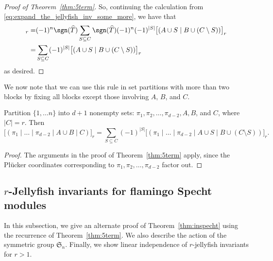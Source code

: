 \begin{proof}[Proof of Theorem~\ref{thm:5term}]
So, continuing the calculation from \eqref{eq:expand_the_jellyfish_inv_some_more}, we have that 
\begin{align*}
   [(A\cup B \ | \ C)]_r =& (-1)^n\sgn(\widehat{T})\sum_{S\subseteq C}\sgn(\widehat{T})(-1)^n(-1)^{|S|}\big[( A\cup S \mid B\cup (C\setminus S) ) \big]_r \\
    =& \sum_{S\subseteq C}(-1)^{|S|}\big[( A\cup S \mid B\cup (C\setminus S) ) \big]_r
\end{align*}
as desired.
\end{proof}

We now note that we can use this rule in set partitions with more than two blocks by fixing all blocks except those involving $A$, $B$, and $C$.
\begin{corollary}\label{cor:twoblocks}
Partition $\{1,\ldots n\}$ into $d+1$ nonempty sets: $\pi_1,\pi_2,\ldots,\pi_{d-2}, A, B$, and $C$, where $|C|=r$. Then 
\begin{equation}
\label{eq:manyterm}
\big[(\pi_1 \mid \ldots \mid \pi_{d-2} \mid A\cup B \mid C)\big]_r=\sum_{S\subseteq C}(-1)^{|S|}\big[(\pi_1 \mid \ldots \mid \pi_{d-2} \mid A\cup S \mid B\cup (C\setminus S))\big]_r.
\end{equation}
\end{corollary}
\begin{proof}
The arguments in the proof of Theorem~\ref{thm:5term} apply, since the Pl\"ucker coordinates corresponding to $\pi_1,\pi_2,\ldots,\pi_{d-2}$ factor out.
\end{proof}


\subsection{\texorpdfstring{$r$}{r}-Jellyfish invariants for flamingo Specht modules}
\label{sec:rest}
In this subsection, we give an alternate proof of Theorem~\ref{thm:inspecht} using the recurrence of Theorem~\ref{thm:5term}. We also describe the action of the symmetric group $\mathfrak{S}_n$. Finally, we show linear independence of $r$-jellyfish invariants for $r>1$.

